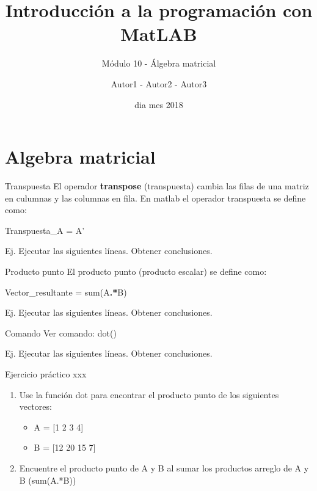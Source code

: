 \documentclass{bredelebeamer}
\title[Programación en MatLAB]{Introducción a la programación con MatLAB}
\subtitle{Módulo 10 - Álgebra matricial}
\author{Autor1 - Autor2 - Autor3\inst{1}}
\institute[UTN.BA]
{
  \inst{1}%
  Universidad Tecnológica Nacional\\
  Facultad Regional Buenos Aires
  }
\date{dia mes 2018}
\begin{document}
\begin{frame}
  \titlepage 
\end{frame}



\section{Algebra matricial}

\begin{frame}{Transpuesta}
El operador \textbf{transpose} (transpuesta) cambia las filas de una matriz en culumnas y las columnas en fila. En matlab el operador transpuesta se define como:
\begin{center}
Transpuesta\_A = A'
\end{center}
Ej. Ejecutar las siguientes líneas. Obtener conclusiones.
\end{frame}

\begin{frame}{Producto punto}
El producto punto (producto escalar) se define como:
\begin{center}
Vector\_resultante = sum(A\textbf{.*}B)
\end{center}
Ej. Ejecutar las siguientes líneas. Obtener conclusiones.
\begin{exampleblock}{Comando}
Ver comando: dot()
\end{exampleblock}
Ej. Ejecutar las siguientes líneas. Obtener conclusiones.
\end{frame}

\begin{frame}{Ejercicio práctico xxx}
\begin{enumerate}
\item Use la función dot para encontrar el producto punto de los siguientes vectores:
\begin{itemize}
\item A = [1 2 3 4]
\item B = [12 20 15 7]
\end{itemize}
\item Encuentre el producto punto de A y B al sumar los productos arreglo de A y B (sum(A.*B))
\end{enumerate}
\end{frame}
\end{document}
